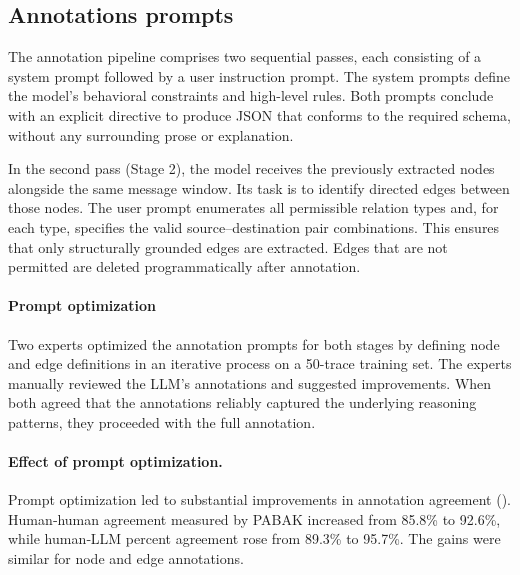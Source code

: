 \subsection{Annotations prompts} \label{app:epist-prompts}

The annotation pipeline comprises two sequential passes, each consisting of a system prompt followed by a user instruction prompt. The system prompts define the model’s behavioral constraints and high-level rules. Both prompts conclude with an explicit directive to produce JSON that conforms to the required schema, without any surrounding prose or explanation.





In the second pass (Stage 2), the model receives the previously extracted nodes alongside the same message window. Its task is to identify directed edges between those nodes. The user prompt enumerates all permissible relation types and, for each type, specifies the valid source–destination pair combinations. This ensures that only structurally grounded edges are extracted. Edges that are not permitted are deleted programmatically after annotation.





\paragraph{Prompt optimization}

Two experts optimized the annotation prompts for both stages by defining node and edge definitions in an iterative process on a 50-trace training set. The experts manually reviewed the LLM’s annotations and suggested improvements. When both agreed that the annotations reliably captured the underlying reasoning patterns, they proceeded with the full annotation.

\paragraph{Effect of prompt optimization.}

Prompt optimization led to substantial improvements in annotation agreement (). Human‑human agreement measured by PABAK increased from 85.8\% to 92.6\%, while human‑LLM percent agreement rose from 89.3\% to 95.7\%. The gains were similar for node and edge annotations.

